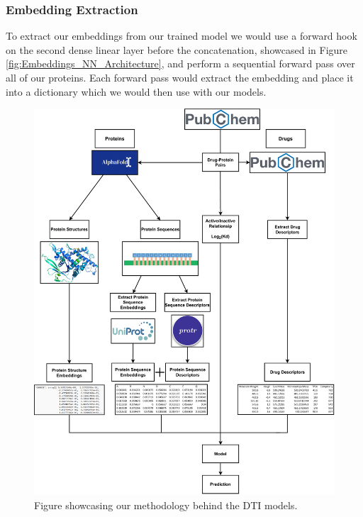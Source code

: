 \subsubsection{Embedding Extraction}
\label{subsubsec:Embedding_Extraction}

To extract our embeddings from our trained model we would use a forward hook on the second dense linear layer before the concatenation, showcased in Figure \ref{fig:Embeddings_NN_Architecture}, and perform a sequential forward pass over all of our proteins. Each forward pass would extract the embedding and place it into a dictionary which we would then use with our models.

\begin{figure}[!h]
    \centering
    \includegraphics[width=0.95\linewidth]{images/DTIs_Methodology.pdf}    
    \caption{Figure showcasing our methodology behind the DTI models.}
    \label{fig:DTIs_Methodology} 
\end{figure}

